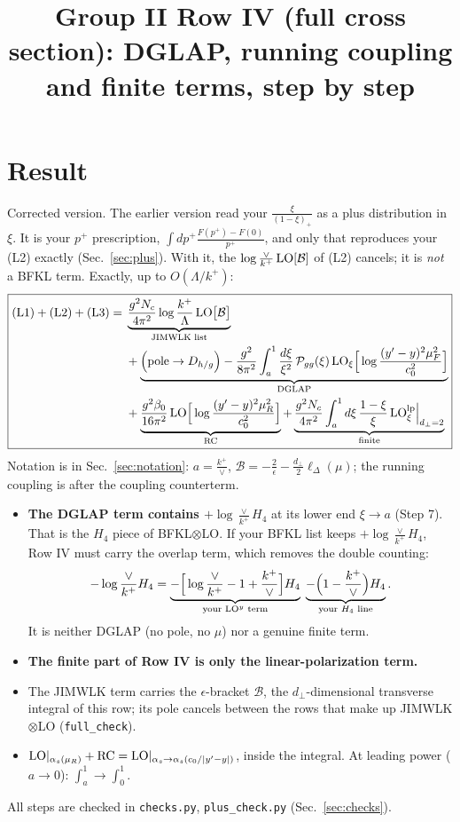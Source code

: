 \documentclass[10pt]{article}
\title{Group II Row IV (full cross section): DGLAP, running coupling and finite terms, step by step}
\date{}
\numberwithin{equation}{section}
\newcommand{\LO}{{\rm LO}}
\newcommand{\new}[1]{{\color{blue}#1}}
\begin{document}
\maketitle

\section{Result}
\new{Corrected version.} The earlier version read your $\frac{\xi}{(1-\xi)_+}$ as a plus distribution in $\xi$. It is your $p^+$ prescription, $\int dp^+\frac{F(p^+)-F(0)}{p^+}$, and only that reproduces your (L2) exactly (Sec.~\ref{sec:plus}). With it, the $\log\frac{\vee}{k^+}\,\LO[\mathcal B]$ of (L2) cancels; it is \emph{not} a BFKL term. Exactly, up to $O(\Lambda/k^+)$:
\begin{equation}
\boxed{\begin{aligned}\text{(L1)}+\text{(L2)}+\text{(L3)}={}&\underbrace{\frac{g^2N_c}{4\pi^2}\log\frac{k^+}{\Lambda}\,\LO\big[\mathcal B\big]}_{\text{JIMWLK list}}\\&+\underbrace{\Big(\text{pole}\to D_{h/g}\Big)-\frac{g^2}{8\pi^2}\int_{a}^{1}\frac{d\xi}{\xi^2}\,\mathcal P_{gg}(\xi)\,\LO_\xi\Big[\log\frac{(y'-y)^2\mu_F^2}{c_0^2}\Big]}_{\rm DGLAP}\\&+\underbrace{\frac{g^2\beta_0}{16\pi^2}\,\LO\Big[\log\frac{(y'-y)^2\mu_R^2}{c_0^2}\Big]}_{\rm RC}
+\underbrace{\frac{g^2N_c}{4\pi^2}\int_{a}^{1}d\xi\,\frac{1-\xi}{\xi}\,\LO^{\rm lp}_\xi\Big|_{d_\perp=2}}_{\rm finite}\end{aligned}}\label{eq:result}
\end{equation}
Notation is in Sec.~\ref{sec:notation}: $a=\frac{k^+}{\vee}$, $\mathcal B=-\frac2\epsilon-\frac{d_\perp}{2}\ell_\Delta(\mu)$; the running coupling is after the coupling counterterm.
\begin{itemize}
\item \textbf{The DGLAP term contains $+\log\frac{\vee}{k^+}H_4$} at its lower end $\xi\to a$ (Step 7). That is the $H_4$ piece of BFKL$\otimes$LO. If your BFKL list keeps $+\log\frac{\vee}{k^+}H_4$, Row IV must carry the overlap term, which removes the double counting:
\begin{equation}
-\log\frac{\vee}{k^+}H_4=\underbrace{-\Big[\log\frac{\vee}{k^+}-1+\frac{k^+}{\vee}\Big]H_4}_{\text{your }\LO^{y}\text{ term}}\;\underbrace{-\Big(1-\frac{k^+}{\vee}\Big)H_4}_{\text{your }H_4\text{ line}}.\label{eq:overlap}
\end{equation}
It is neither DGLAP (no pole, no $\mu$) nor a genuine finite term.
\item \textbf{The finite part of Row IV is only the linear-polarization term.}
\item The JIMWLK term carries the $\epsilon$-bracket $\mathcal B$, the $d_\perp$-dimensional transverse integral of this row; its pole cancels between the rows that make up JIMWLK$\otimes$LO (\texttt{full\_check}).
\item $\LO|_{\alpha_s(\mu_R)}+{\rm RC}=\LO|_{\alpha_s\to\alpha_s(c_0/|y'-y|)}$, inside the integral. At leading power ($a\to0$): $\int_a^1\to\int_0^1$.
\end{itemize}
All steps are checked in \texttt{checks.py}, \texttt{plus\_check.py} (Sec.~\ref{sec:checks}).
\end{document}
